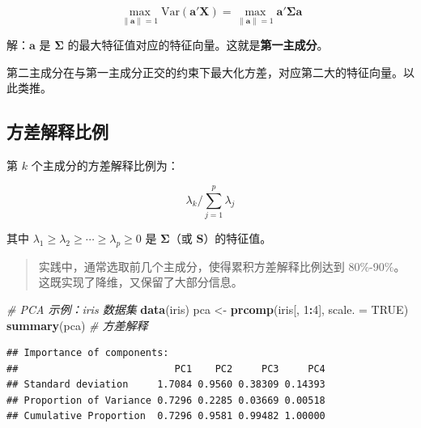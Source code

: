 \documentclass[
]{book}
\newenvironment{Shaded}{\begin{snugshade}}{\end{snugshade}}
\newcommand{\AttributeTok}[1]{\textcolor[rgb]{0.13,0.29,0.53}{#1}}
\newcommand{\CommentTok}[1]{\textcolor[rgb]{0.56,0.35,0.01}{\textit{#1}}}
\newcommand{\ConstantTok}[1]{\textcolor[rgb]{0.56,0.35,0.01}{#1}}
\newcommand{\DecValTok}[1]{\textcolor[rgb]{0.00,0.00,0.81}{#1}}
\newcommand{\FunctionTok}[1]{\textcolor[rgb]{0.13,0.29,0.53}{\textbf{#1}}}
\newcommand{\NormalTok}[1]{#1}
\newcommand{\OtherTok}[1]{\textcolor[rgb]{0.56,0.35,0.01}{#1}}
\newcommand{\SpecialCharTok}[1]{\textcolor[rgb]{0.81,0.36,0.00}{\textbf{#1}}}
\begin{document}
\[\max_{\|\mathbf{a}\|=1} \text{Var}(\mathbf{a}'\mathbf{X}) = \max_{\|\mathbf{a}\|=1} \mathbf{a}' \boldsymbol{\Sigma} \mathbf{a}\]

解：\(\mathbf{a}\) 是 \(\boldsymbol{\Sigma}\) 的最大特征值对应的特征向量。这就是\textbf{第一主成分}。

第二主成分在与第一主成分正交的约束下最大化方差，对应第二大的特征向量。以此类推。

\subsection{方差解释比例}\label{ux65b9ux5deeux89e3ux91caux6bd4ux4f8b}

第 \(k\) 个主成分的方差解释比例为：

\[\lambda_k \Big/ \sum_{j=1}^p \lambda_j\]

其中 \(\lambda_1 \geq \lambda_2 \geq \cdots \geq \lambda_p \geq 0\) 是 \(\boldsymbol{\Sigma}\)（或 \(\mathbf{S}\)）的特征值。

\begin{quote}
实践中，通常选取前几个主成分，使得累积方差解释比例达到 80\%-90\%。这既实现了降维，又保留了大部分信息。
\end{quote}

\begin{Shaded}
\begin{Highlighting}[]
\CommentTok{\# PCA 示例：iris 数据集}
\FunctionTok{data}\NormalTok{(iris)}
\NormalTok{pca }\OtherTok{\textless{}{-}} \FunctionTok{prcomp}\NormalTok{(iris[, }\DecValTok{1}\SpecialCharTok{:}\DecValTok{4}\NormalTok{], }\AttributeTok{scale. =} \ConstantTok{TRUE}\NormalTok{)}
\FunctionTok{summary}\NormalTok{(pca)          }\CommentTok{\# 方差解释}
\end{Highlighting}
\end{Shaded}

\begin{verbatim}
## Importance of components:
##                           PC1    PC2     PC3     PC4
## Standard deviation     1.7084 0.9560 0.38309 0.14393
## Proportion of Variance 0.7296 0.2285 0.03669 0.00518
## Cumulative Proportion  0.7296 0.9581 0.99482 1.00000
\end{verbatim}

\begin{Shaded}
\end{Shaded}
\end{document}
